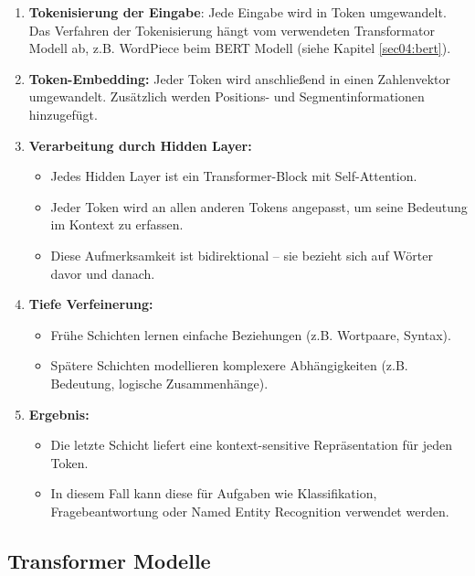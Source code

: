 \begin{enumerate}
    \item \textbf{Tokenisierung der Eingabe}: Jede Eingabe wird in Token umgewandelt. Das Verfahren der Tokenisierung hängt vom verwendeten Transformator Modell ab,
    z.B. WordPiece beim BERT Modell (siehe Kapitel \ref{sec04:bert}).

    \item \textbf{Token-Embedding:} Jeder Token wird anschließend in einen Zahlenvektor umgewandelt. 
    Zusätzlich werden Positions- und Segmentinformationen hinzugefügt.
    
    \item \textbf{Verarbeitung durch Hidden Layer:} 
    \begin{itemize}
        \item Jedes Hidden Layer ist ein Transformer-Block mit Self-Attention.
        \item Jeder Token wird an allen anderen Tokens angepasst, um seine Bedeutung im Kontext zu erfassen.
        \item Diese Aufmerksamkeit ist bidirektional – sie bezieht sich auf Wörter davor und danach.
    \end{itemize}
    
    \item \textbf{Tiefe Verfeinerung:} 
    \begin{itemize}
        \item Frühe Schichten lernen einfache Beziehungen (z.B. Wortpaare, Syntax).
        \item Spätere Schichten modellieren komplexere Abhängigkeiten (z.B. Bedeutung, logische Zusammenhänge).
    \end{itemize}
    
    \item \textbf{Ergebnis:} 
    \begin{itemize}
        \item Die letzte Schicht liefert eine kontext-sensitive Repräsentation für jeden Token.
        \item In diesem Fall kann diese für Aufgaben wie Klassifikation, Fragebeantwortung oder Named Entity Recognition verwendet werden.
    \end{itemize}
\end{enumerate} 


\subsection{Transformer Modelle}
\label{sec:transformer_modelle}

